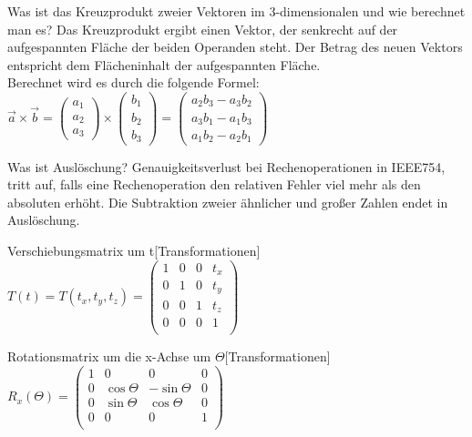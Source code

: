 \documentclass[a7paper,print]{kartei}
\begin{document}
\begin{karte}[CGIS]{Was ist das Kreuzprodukt zweier Vektoren im 3-dimensionalen und wie berechnet man es?}
Das Kreuzprodukt ergibt einen Vektor, der senkrecht auf der aufgespannten Fläche der beiden Operanden steht. Der Betrag des neuen Vektors entspricht dem Flächeninhalt der aufgespannten Fläche.\\
Berechnet wird es durch die folgende Formel:\\
$ \overrightarrow{a} \times \overrightarrow{b} = \left( \begin{array}{c} a_1 \\ a_2 \\ a_3 \end{array} \right) \times \left( \begin{array}{c} b_1 \\ b_2 \\ b_3 \end{array} \right)
=
\left(
   \begin{array}{c}
     a_2b_3 - a_3b_2 \\
     a_3b_1 - a_1b_3 \\
     a_1b_2 - a_2b_1
   \end{array}
\right)$
\end{karte}

\begin{karte}[CGIS]{Was ist Auslöschung?}
Genauigkeitsverlust bei Rechenoperationen in IEEE754, tritt auf, falls eine Rechenoperation den relativen Fehler viel mehr als den absoluten erhöht. Die Subtraktion zweier ähnlicher und großer Zahlen endet in Auslöschung.
\end{karte}

\begin{karte}[CGIS]{Verschiebungsmatrix um t}[Transformationen]
$ T(t) = T(t_x,t_y,t_z) = \left( \begin{array}{cccc}
1 & 0 & 0 & t_x \\
0 & 1 & 0 & t_y \\
0 & 0 & 1 & t_z \\
0 & 0 & 0 & 1 \\
\end{array}
\right)
$
\end{karte}

\begin{karte}[CGIS]{Rotationsmatrix um die x-Achse um $\Theta$}[Transformationen]
$ R_x(\Theta) = \left( \begin{array}{cccc}
1 & 0 & 0 & 0 \\
0 & \cos \Theta & -\sin\Theta & 0 \\
0 & \sin \Theta & \cos \Theta & 0 \\
0 & 0 & 0 & 1 \\
\end{array}
\right)
$
\end{karte}
\end{document}
